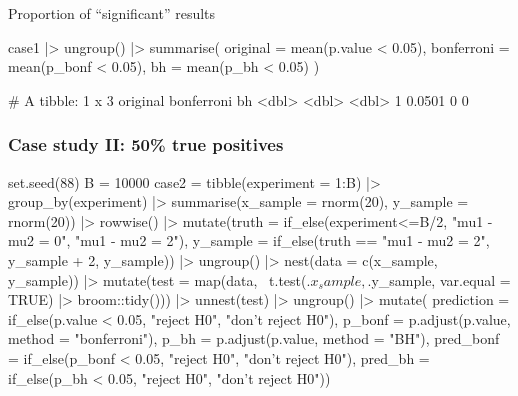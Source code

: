 \documentclass[a4paper]{article}\usepackage[]{graphicx}\usepackage[]{xcolor}
\begin{document}
Proportion of ``significant'' results
\begin{Schunk}
\begin{Sinput}
case1 |> ungroup() |> 
  summarise(
    original = mean(p.value < 0.05),
    bonferroni = mean(p_bonf < 0.05),
    bh = mean(p_bh < 0.05)
  )
\end{Sinput}
\begin{Soutput}
# A tibble: 1 x 3
  original bonferroni    bh
     <dbl>      <dbl> <dbl>
1   0.0501          0     0
\end{Soutput}
\end{Schunk}
\subsubsection{Case study II: 50\% true positives}
\begin{Schunk}
\begin{Sinput}
set.seed(88)
B = 10000
case2 = tibble(experiment = 1:B) |> 
  group_by(experiment) |> 
  summarise(x_sample = rnorm(20), y_sample = rnorm(20)) |> 
  rowwise() |> 
  mutate(truth = if_else(experiment<=B/2, "mu1 - mu2 = 0", "mu1 - mu2 = 2"),
         y_sample = if_else(truth == "mu1 - mu2 = 2", y_sample + 2, y_sample)) |> 
  ungroup() |> 
  nest(data = c(x_sample, y_sample)) |> 
  mutate(test = map(data, ~t.test(.$x_sample, .$y_sample, var.equal = TRUE) |> 
                      broom::tidy())) |> 
  unnest(test) |> ungroup() |> 
  mutate(
    prediction = if_else(p.value < 0.05, "reject H0", "don't reject H0"),
    p_bonf = p.adjust(p.value, method = "bonferroni"),
    p_bh = p.adjust(p.value, method = "BH"),
    pred_bonf = if_else(p_bonf < 0.05, "reject H0", "don't reject H0"),
    pred_bh = if_else(p_bh < 0.05, "reject H0", "don't reject H0"))
\end{Sinput}
\end{Schunk}
\end{document}
